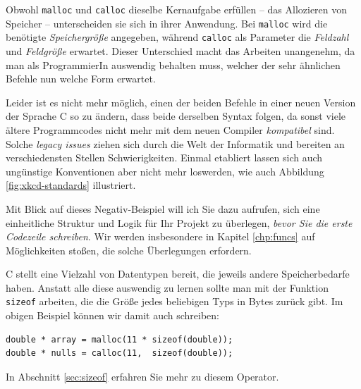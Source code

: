 \begin{hintbox}
Obwohl \texttt{malloc} und \texttt{calloc} dieselbe Kernaufgabe erfüllen -- das Allozieren von Speicher -- unterscheiden sie sich in ihrer Anwendung. Bei \texttt{malloc} wird die benötigte \emph{Speichergröße} angegeben, während \texttt{calloc} als Parameter die \emph{Feldzahl} und \emph{Feldgröße} erwartet. Dieser Unterschied macht das Arbeiten unangenehm, da man als ProgrammierIn auswendig behalten muss, welcher der sehr ähnlichen Befehle nun welche Form erwartet.

Leider ist es nicht mehr möglich, einen der beiden Befehle in einer neuen Version der Sprache C so zu ändern, dass beide derselben Syntax folgen, da sonst viele ältere Programmcodes nicht mehr mit dem neuen Compiler \emph{kompatibel} sind. Solche \emph{legacy issues} ziehen sich durch die Welt der Informatik und bereiten an verschiedensten Stellen Schwierigkeiten. Einmal etabliert lassen sich auch ungünstige Konventionen aber nicht mehr loswerden, wie auch Abbildung \ref{fig:xkcd-standards} illustriert.

Mit Blick auf dieses Negativ-Beispiel will ich Sie dazu aufrufen, sich eine einheitliche Struktur und Logik für Ihr Projekt zu überlegen, \emph{bevor Sie die erste Codezeile schreiben}. Wir werden insbesondere in Kapitel \ref{chp:funcs} auf Möglichkeiten stoßen, die solche Überlegungen erfordern.
\end{hintbox}

\begin{hintbox}
C stellt eine Vielzahl von Datentypen bereit, die jeweils andere Speicherbedarfe haben. Anstatt alle diese auswendig zu lernen sollte man mit der Funktion \texttt{sizeof} arbeiten, die die Größe jedes beliebigen Typs in Bytes zurück gibt. Im obigen Beispiel können wir damit auch schreiben:
\begin{codebox}
\begin{verbatim}
double * array = malloc(11 * sizeof(double));
double * nulls = calloc(11,  sizeof(double));
\end{verbatim}
\end{codebox}
In Abschnitt \ref{sec:sizeof} erfahren Sie mehr zu diesem Operator.
\end{hintbox}

